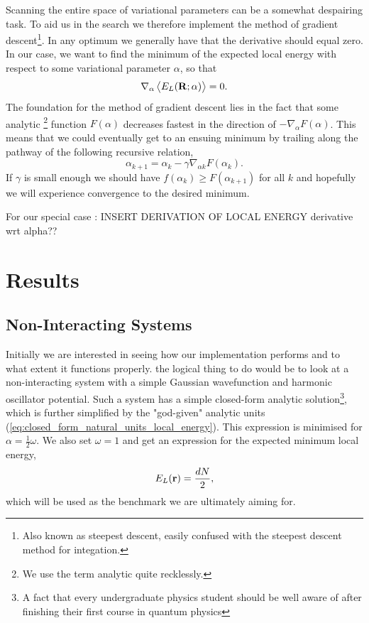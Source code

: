 \documentclass[
    a4paper, aps, twocolumn, floatfix, superscriptaddress, nofootinbib]{revtex4-1}
\newcommand{\1}{\mathds{1}}
\begin{document}
		Scanning the entire space of variational parameters can be a somewhat despairing task. To aid us in the search we
		therefore implement the method of gradient descent\footnote{Also known as steepest descent, easily confused
		with the steepest descent method for integation.}. In any optimum we generally have that the derivative should equal
		zero. In our case, we want to find the minimum of the expected local energy with respect to some variational
		parameter $\alpha$, so that
		\begin{equation}
			\nabla_\alpha \expval{E_L(\mathbf{R}; \alpha)} = 0.
		\end{equation}	
		The foundation for  the method of gradient descent lies in the fact that some analytic
		\footnote{We use the term analytic quite recklessly.} function $F(\alpha)$ decreases fastest in the direction
		of $-\nabla_\alpha F(\alpha)$. This means that we could eventually get to an ensuing minimum by trailing along the
		pathway of the following recursive relation,
		\begin{equation}
			\alpha_{k+1} = \alpha_k - \gamma \nabla_{\alpha k} F(\alpha_k).
		\end{equation}
		If $\gamma$ is small enough we should have $f(\alpha_k) \geq F(\alpha_{k+1})$ for all $k$ and hopefully we will
		experience convergence to the desired minimum. 
		
		For our special case : INSERT DERIVATION OF LOCAL ENERGY derivative wrt alpha??

\section{Results}

    \subsection{Non-Interacting Systems}
    Initially we are interested in seeing how our implementation performs and to what extent it functions properly.
    the logical thing to do would be to look at a non-interacting system with a simple Gaussian wavefunction and
    harmonic oscillator potential. Such a system has a simple closed-form analytic solution\footnote{A fact that every
    undergraduate physics student should be well aware of after finishing their first course in quantum physics}, 
    which is further simplified by the "god-given" analytic
    units (\autoref{eq:closed_form_natural_units_local_energy}). This expression is minimised for
    $\alpha = \frac{1}{2}\omega$. We also set $\omega = 1$ and get an expression for the
    expected minimum local energy,
    \begin{equation}
        E_L(\vb{r}) = \frac{dN}{2},
    \end{equation}
    which will be used as the benchmark we are ultimately aiming for.
\end{document}
